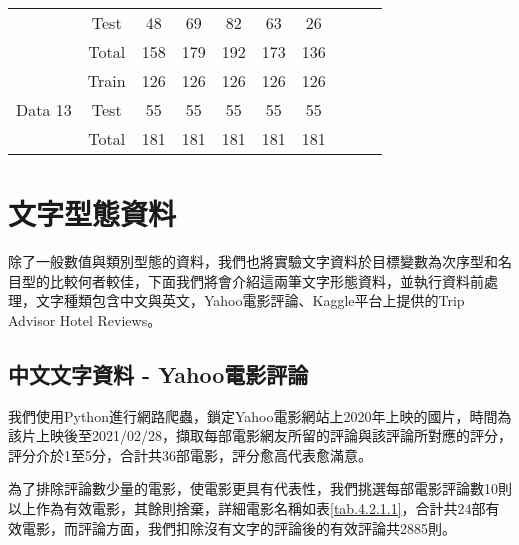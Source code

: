 \begin{table}[H]
{\begin{tabular}{cccccccccc}
                         & Test  & 48    & 69    & 82    & 63    & 26    &      &      &      \\
                         & Total & 158   & 179   & 192   & 173   & 136   &      &      &      \\ \hline
\multirow{3}{*}{Data 13} & Train & 126   & 126   & 126   & 126   & 126   &      &      &      \\
                         & Test  & 55    & 55    & 55    & 55    & 55    &      &      &      \\
                         & Total & 181   & 181   & 181   & 181   & 181   &      &      &      \\ \hline
\end{tabular}
}\end{table}
 

	
\section{文字型態資料}
	
	除了一般數值與類別型態的資料，我們也將實驗文字資料於目標變數為次序型和名目型的比較何者較佳，下面我們將會介紹這兩筆文字形態資料，並執行資料前處理，文字種類包含中文與英文，Yahoo電影評論、Kaggle平台上提供的Trip Advisor Hotel Reviews。


\subsection{中文文字資料 - Yahoo電影評論}

	我們使用Python進行網路爬蟲，鎖定Yahoo電影網站上2020年上映的國片，時間為該片上映後至2021/02/28，擷取每部電影網友所留的評論與該評論所對應的評分，評分介於1至5分，合計共36部電影，評分愈高代表愈滿意。
	
	為了排除評論數少量的電影，使電影更具有代表性，我們挑選每部電影評論數10則以上作為有效電影，其餘則捨棄，詳細電影名稱如表\ref{tab.4.2.1.1}，合計共24部有效電影，而評論方面，我們扣除沒有文字的評論後的有效評論共2885則。
	
